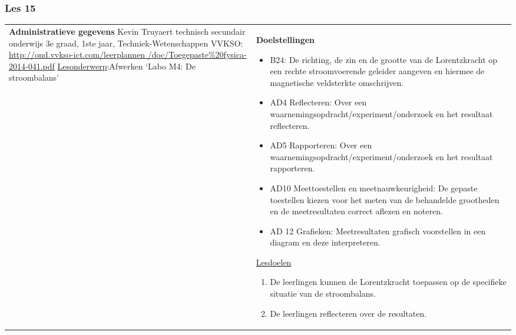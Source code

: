 


\begin{landscape}
	\subsubsection{Les 15}
	\begin{tabularx}{1.56\textwidth}{|p{}|X|}\hline
		\textbf{Administratieve gegevens}\newline\newline
		Kevin Truyaert\newline\newline
		technisch secundair onderwijs\newline
		3e graad, 1ste jaar, Techniek-Wetenschappen\newline
		VVKSO: \href{http://ond.vvkso-ict.com/leerplannen/doc/Toegepaste\%20fysica-2014-041.pdf}{http://ond.vvkso-ict.com/leerplannen /doc/Toegepaste\%20fysica-2014-041.pdf} \newline
		\underline{Lesonderwerp}:\newline Afwerken `Labo M4: De stroombalans' & \textbf{Doelstellingen}
		\begin{itemize}[itemsep=0.08\baselineskip]
			\item B24: De richting, de zin en de grootte van de Lorentzkracht op een rechte stroomvoerende geleider aangeven en hiermee de magnetische veldsterkte omschrijven. 
			\item AD4 Reflecteren: Over een waarnemingsopdracht/experiment/onderzoek en het resultaat reflecteren.
			\item AD5 Rapporteren: Over een waarnemingsopdracht/experiment/onderzoek en het resultaat rapporteren.
			\item AD10 Meettoestellen en meetnauwkeurigheid: De gepaste toestellen kiezen voor het meten van de behandelde grootheden en de meetresultaten correct aflezen en noteren.
			\item AD 12 Grafieken: Meetresultaten grafisch voorstellen in een diagram en deze interpreteren.
		\end{itemize}
		\underline{Lesdoelen}\newline
		\vspace{-0.75cm}
		\begin{enumerate}[itemsep=0.08\baselineskip]
			\item De leerlingen kunnen de Lorentzkracht toepassen op de specifieke situatie van de stroombalans.
			\item De leerlingen reflecteren over de resultaten.

\end{enumerate}
\end{tabularx}
\end{landscape}
